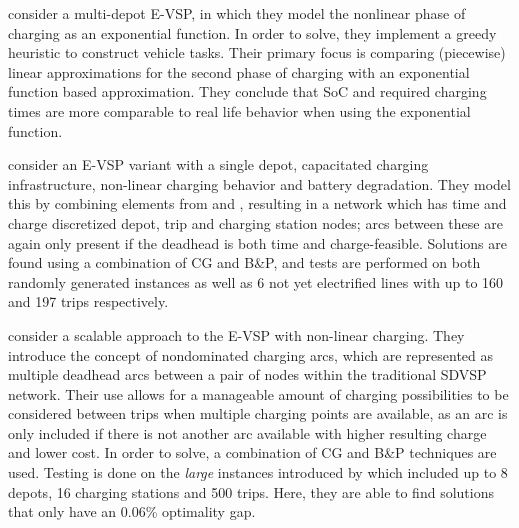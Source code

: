 \documentclass[]{article}
\begin{document}
\citet{Olsen2020} consider a multi-depot E-VSP, in which they model the nonlinear phase of charging as an exponential function. In order to solve, they implement a greedy heuristic to construct vehicle tasks. Their primary focus is comparing (piecewise) linear approximations for the second phase of charging with an exponential function based approximation. They conclude that SoC and required charging times are more comparable to real life behavior when using the exponential function.

\citet{Zhang2021} consider an E-VSP variant with a single depot, capacitated charging infrastructure, non-linear charging behavior and battery degradation. They model this by combining elements from \citet{Li2014} and \citet{vanKootenNiekerk2017}, resulting in a network which has time and charge discretized depot, trip and charging station nodes; arcs between these are again only present if the deadhead is both time and charge-feasible. Solutions are found using a combination of CG and B\&P, and tests are performed on both randomly generated instances as well as 6 not yet electrified lines with up to 160 and 197 trips respectively.

\citet{Parmentier2023} consider a scalable approach to the E-VSP with non-linear charging. They introduce the concept of nondominated charging arcs, which are represented as multiple deadhead arcs between a pair of nodes within the traditional SDVSP network. Their use allows for a manageable amount of charging possibilities to be considered between trips when multiple charging points are available, as an arc is only included if there is not another arc available with higher resulting charge and lower cost. In order to solve, a combination of CG and B\&P techniques are used. Testing is done on the \textit{large} instances introduced by \citet{Wen2016} which included up to 8 depots, 16 charging stations and 500 trips. Here, they are able to find solutions that only have an 0.06\% optimality gap.
\end{document}
